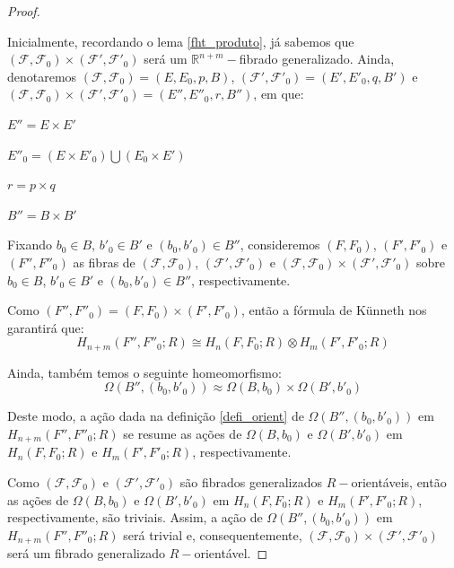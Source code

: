\documentclass[12pt,oneside]{book} %
\newcommand{\R}{\mathbb{R}}
\newcommand{\tensor}{\otimes}
\begin{document}
\begin{proof}
	
	\
	
	\par Inicialmente, recordando o lema \ref{fht_produto}, já sabemos que $(\mathcal{F},\mathcal{F}_{0})\times (\mathcal{F'},\mathcal{F'}_{0})$ será um $\R^{n+m}-$fibrado generalizado. Ainda, denotaremos $(\mathcal{F},\mathcal{F}_{0})=(E,E_{0},p,B)$, $(\mathcal{F'},\mathcal{F'}_{0})=(E',E'_{0},q,B')$ e $(\mathcal{F},\mathcal{F}_{0})\times (\mathcal{F'},\mathcal{F'}_{0})=(E'',E''_{0},r,B'')$, em que: \newline
	
	$E''=E\times E'$
	
	$E''_{0}=\left( E\times E'_{0} \right)\bigcup \left( E_{0}\times E' \right)$
	
	$r=p\times q$
	
	$B''=B\times B'$ \newline
	
	\par Fixando $b_{0}\in B$, $b'_{0}\in B'$ e $(b_{0},b'_{0})\in B''$, consideremos $(F,F_{0})$, $(F',F'_{0})$ e $(F'',F''_{0})$ as fibras de $(\mathcal{F},\mathcal{F}_{0})$, $(\mathcal{F'},\mathcal{F'}_{0})$ e $(\mathcal{F},\mathcal{F}_{0})\times (\mathcal{F'},\mathcal{F'}_{0})$ sobre $b_{0}\in B$, $b'_{0}\in B'$ e $(b_{0},b'_{0})\in B''$, respectivamente.
	
	\par Como $(F'',F''_{0})=(F,F_{0})\times (F',F'_{0})$, então a fórmula de Künneth nos garantirá que:
	$$ H_{n+m}(F'',F''_{0};R)\cong H_{n}(F,F_{0};R)\tensor H_{m}(F',F'_{0};R) $$
	
	\par Ainda, também temos o seguinte homeomorfismo:
	$$ \Omega(B'',(b_{0},b'_{0}))\approx \Omega(B,b_{0})\times\Omega(B',b'_{0}) $$
	
	\par Deste modo, a ação dada na definição \ref{defi_orient} de $\Omega(B'',(b_{0},b'_{0}))$ em $H_{n+m}(F'',F''_{0};R)$ se resume as ações de $\Omega(B,b_{0})$ e $\Omega(B',b'_{0})$ em $H_{n}(F,F_{0};R)$ e $H_{m}(F',F'_{0};R)$, respectivamente.
	
	\par Como $(\mathcal{F},\mathcal{F}_{0})$ e $(\mathcal{F'},\mathcal{F'}_{0})$ são fibrados generalizados $R-$orientáveis, então as ações de $\Omega(B,b_{0})$ e $\Omega(B',b'_{0})$ em $H_{n}(F,F_{0};R)$ e $H_{m}(F',F'_{0};R)$, respectivamente, são triviais. Assim, a ação de $\Omega(B'',(b_{0},b'_{0}))$ em $H_{n+m}(F'',F''_{0};R)$ será trivial e, consequentemente, $(\mathcal{F},\mathcal{F}_{0})\times (\mathcal{F'},\mathcal{F'}_{0})$ será um fibrado generalizado $R-$orientável.
	

\end{proof}
\end{document}
